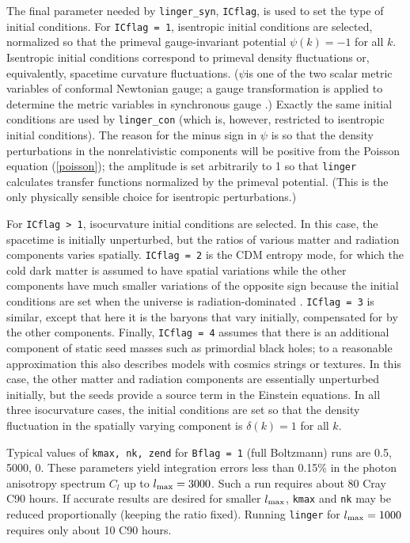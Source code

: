 The final parameter needed by {\tt linger\_syn}, {\tt ICflag}, is used
to set the type of initial conditions.  For {\tt ICflag = 1}, isentropic
initial conditions are selected, normalized so that the primeval
gauge-invariant potential $\psi(k)=-1$ for all $k$.  Isentropic initial
conditions correspond to primeval density fluctuations or, equivalently,
spacetime curvature fluctuations.  ($\psi$is one of the two scalar metric
variables of conformal Newtonian gauge; a gauge transformation is applied
to determine the metric variables in synchronous gauge \cite{mab1}.)
Exactly the same initial conditions are used by {\tt linger\_con}
(which is, however, restricted to isentropic initial conditions).  The
reason for the minus sign in $\psi$ is so that the density perturbations
in the nonrelativistic components will be positive from the Poisson
equation (\ref{poisson}); the amplitude is set arbitrarily to 1 so that
{\tt linger} calculates transfer functions normalized by the primeval
potential.  (This is the only physically sensible choice for isentropic
perturbations.)

For {\tt ICflag > 1}, isocurvature initial conditions are selected.  In
this case, the spacetime is initially unperturbed, but the ratios of
various matter and radiation components varies spatially.  {\tt ICflag
= 2} is the CDM entropy mode, for which the cold dark matter is assumed
to have spatial variations while the other components have much smaller
variations of the opposite sign because the initial conditions are set
when the universe is radiation-dominated \cite{be87}.  {\tt ICflag = 3}
is similar, except that here it is the baryons that vary initially,
compensated for by the other components.  Finally, {\tt ICflag = 4}
assumes that there is an additional component of static seed masses
such as primordial black holes; to a reasonable approximation this
also describes models with cosmics strings or textures.  In this case,
the other matter and radiation components are essentially unperturbed
initially, but the seeds provide a source term in the Einstein equations.
In all three isocurvature cases, the initial conditions are set so that
the density fluctuation in the spatially varying component is $\delta(k)=1$
for all $k$.

Typical values of {\tt  kmax, nk, zend} for {\tt Bflag = 1} (full Boltzmann)
runs are 0.5, 5000, 0.  These parameters yield integration errors less
than 0.15\% in the photon anisotropy spectrum $C_l$ up to $l_{\rm max}=3000$.
Such a run requires about 80 Cray C90 hours.  If accurate results are desired
for smaller $l_{\rm max}$, {\tt kmax} and {\tt nk} may be reduced
proportionally (keeping the ratio fixed).  Running {\tt linger} for
$l_{\rm max}=1000$ requires only about 10 C90 hours.


